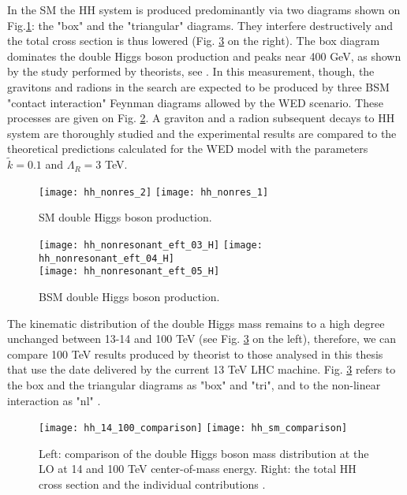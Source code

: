 In the SM the HH system is produced predominantly via two diagrams shown on Fig.\ref{SM_HH}: the "box" and the "triangular" diagrams. They interfere destructively and the total cross section is thus lowered (Fig. \ref{hh_comparison} on the right). The box diagram dominates the double Higgs boson production and peaks near 400 GeV, as shown by the study performed by theorists, see \cite{Chen:2014xra}. In this measurement, though, the gravitons and radions in the search are expected to be produced by three BSM "contact interaction" Feynman diagrams allowed by the WED scenario. These processes are given on Fig. \ref{BSM_HH}.  A graviton and a radion subsequent decays to HH system are thoroughly studied and the experimental results are compared to the theoretical predictions calculated for the WED model with the parameters $\tilde{k}=0.1$ and $\Lambda_R = 3 $ TeV.  




\begin{figure}[H]
  \centering
    \texttt{[image: hh\_nonres\_2]}
     \texttt{[image: hh\_nonres\_1]}
    \caption{SM double Higgs boson production.}
    \label{SM_HH}
\end{figure}


\begin{figure}[H]
  \centering
    \texttt{[image: hh\_nonresonant\_eft\_03\_H]}
    \texttt{[image: hh\_nonresonant\_eft\_04\_H]}\\
     \texttt{[image: hh\_nonresonant\_eft\_05\_H]}
    \caption{BSM double Higgs boson production.}
    \label{BSM_HH}
\end{figure}



The kinematic distribution of the double Higgs mass remains to a high degree unchanged between 13-14 and 100 TeV (see Fig. \ref{hh_comparison} on the left), therefore, we can compare 100 TeV results produced by theorist to those analysed in this thesis that use the date delivered by the current 13 TeV LHC machine. Fig. \ref{hh_comparison} refers to the box and the triangular diagrams as "box" and "tri", and to the non-linear interaction as "nl"  \cite{Contino:2012xk}. 



 
 

\begin{figure}[H]
  \centering 
    \texttt{[image: hh\_14\_100\_comparison]}
    \texttt{[image: hh\_sm\_comparison]}
    \caption[Double Higgs mass distribution and the total cross-section]{Left: comparison of the double Higgs boson mass distribution at the LO at 14 and 100 TeV center-of-mass energy. Right: the total HH cross section and the individual contributions \cite{Contino:2012xk}.}
    \label{hh_comparison}
\end{figure}



